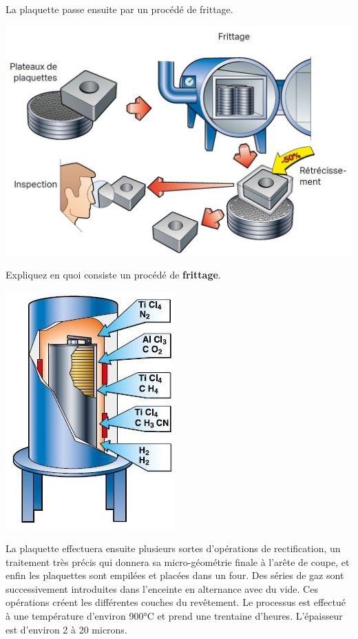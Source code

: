 \documentclass[12pt]{article}
\newcounter{exo}
\newenvironment{exo}{\stepcounter{exo}\vspace{0.5cm}{\bfseries Question \theexo\ :}}{\par\vspace{0.5cm}}
\begin{document}
\noindent
La plaquette passe ensuite par un procédé de frittage.


\begin{center}
\includegraphics[width=0.7\linewidth]{Images/PLA13.JPG}
\end{center}


\begin{exo} Expliquez en quoi consiste un procédé de \textbf{frittage}.\end{exo}


\begin{minipage}{.55\linewidth}
\includegraphics[width=0.7\linewidth]{Images/PLA15.JPG}
\end{minipage}
\begin{minipage}{.44\linewidth}
La plaquette effectuera ensuite plusieurs sortes d'opérations de rectification, un traitement très précis qui donnera sa micro-géométrie finale à l'arête de coupe, et enfin les plaquettes sont empilées et placées dans un four. Des séries de gaz sont successivement introduites dans l'enceinte en alternance avec du vide. Ces opérations créent les différentes couches du revêtement. Le processus est effectué à une température d'environ 900°C et prend une trentaine d'heures. L'épaisseur est d'environ 2 à 20 microns.
\end{minipage}
\end{document}
